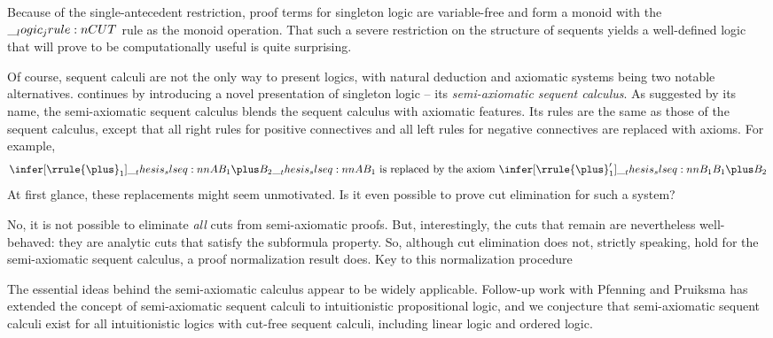 Because of the single-antecedent restriction, proof terms for singleton logic are variable-free and form a monoid with the $\__logic_jrule:n {CUT}$ rule as the monoid operation.
That such a severe restriction on the structure of sequents yields a well-defined logic that will prove to be computationally useful is quite surprising.

Of course, sequent calculi are not the only way to present logics, with natural deduction and axiomatic systems being two notable alternatives.
 continues by introducing a novel presentation of singleton logic -- its \emph{semi-axiomatic sequent calculus}.
As suggested by its name, the semi-axiomatic sequent calculus blends the sequent calculus with axiomatic features.
Its rules are the same as those of the sequent calculus, except that all right rules for positive connectives and all left rules for negative connectives are replaced with axioms.
For example, 
\begin{equation*}
  \infer[\rrule{\plus}_1]{\slseq{A |- B_1 \plus B_2}}{
    \slseq{A |- B_1}}
  \text{ is replaced by the axiom }
  \infer[\rrule{\plus}_1']{\slseq{B_1 |- B_1 \plus B_2}}{}
\end{equation*}
At first glance, these replacements might seem unmotivated.
Is it even possible to prove cut elimination for such a system?

No, it is not possible to eliminate \emph{all} cuts from semi-axiomatic proofs.
But, interestingly, the cuts that remain are nevertheless well-behaved: they are analytic cuts that satisfy the subformula property.
So, although cut elimination does not, strictly speaking, hold for the semi-axiomatic sequent calculus, a proof normalization result does.
Key to this normalization procedure 

The essential ideas behind the semi-axiomatic calculus appear to be widely applicable.
Follow-up work with Pfenning and Pruiksma has extended the concept of semi-axiomatic sequent calculi to intuitionistic propositional logic\autocite{DeYoung+:FSCD20}, and we conjecture that semi-axiomatic sequent calculi exist for all intuitionistic logics with cut-free sequent calculi, including linear logic and ordered logic.





